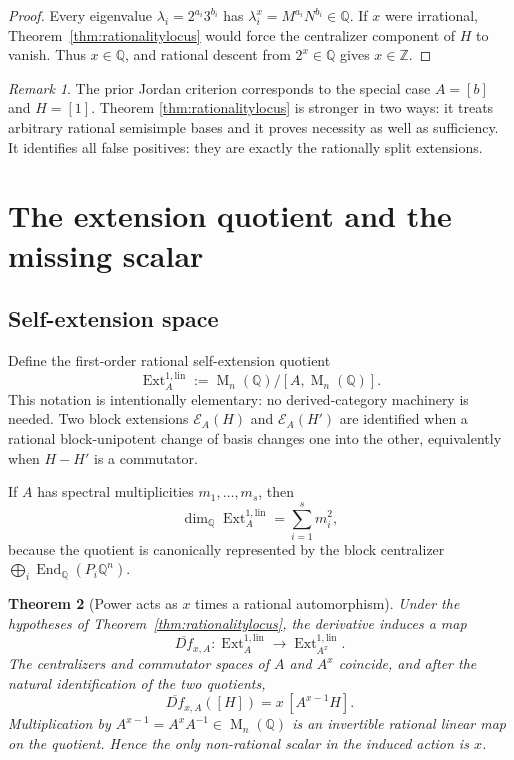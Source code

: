 \documentclass[11pt,oneside]{article}
\newtheorem{theorem}{Theorem}[section]
\theoremstyle{definition}
\theoremstyle{remark}
\newtheorem{remark}[theorem]{Remark}
\newcommand{\Z}{\mathbb Z}
\newcommand{\Q}{\mathbb Q}
\newcommand{\Mat}{\operatorname{M}}
\newcommand{\End}{\operatorname{End}}
\newcommand{\Ext}{\operatorname{Ext}}
\newcommand{\cE}{\mathcal E}
\begin{document}
\begin{proof}
Every eigenvalue $\lambda_i=2^{a_i}3^{b_i}$ has
$\lambda_i^x=M^{a_i}N^{b_i}\in\Q$.  If $x$ were irrational,
Theorem~\ref{thm:rationalitylocus} would force the centralizer component of $H$ to vanish.
Thus $x\in\Q$, and rational descent from $2^x\in\Q$ gives $x\in\Z$.
\end{proof}

\begin{remark}
The prior Jordan criterion corresponds to the special case $A=[b]$ and $H=[1]$.  Theorem
\ref{thm:rationalitylocus} is stronger in two ways: it treats arbitrary rational semisimple
bases and it proves necessity as well as sufficiency.  It identifies all false positives:
they are exactly the rationally split extensions.
\end{remark}

\section{The extension quotient and the missing scalar}
\label{sec:extensionquotient}

\subsection{Self-extension space}

Define the first-order rational self-extension quotient
\begin{equation}
 \Ext_A^{1,\mathrm{lin}}
 :=\Mat_n(\Q)/[A,\Mat_n(\Q)].
 \label{eq:extquotient}
\end{equation}
This notation is intentionally elementary: no derived-category machinery is needed.  Two block
extensions $\cE_A(H)$ and $\cE_A(H')$ are identified when a rational block-unipotent change of
basis changes one into the other, equivalently when $H-H'$ is a commutator.

If $A$ has spectral multiplicities $m_1,\dots,m_s$, then
\begin{equation}
 \dim_\Q \Ext_A^{1,\mathrm{lin}}=\sum_{i=1}^s m_i^2,
 \label{eq:extdimension}
\end{equation}
because the quotient is canonically represented by the block centralizer
$\bigoplus_i\End_\Q(P_i\Q^n)$.

\begin{theorem}[Power acts as $x$ times a rational automorphism]
\label{thm:quotientaction}
Under the hypotheses of Theorem~\ref{thm:rationalitylocus}, the derivative induces a map
\begin{equation}
 \overline{Df}_{x,A}:\Ext_A^{1,\mathrm{lin}}
 \longrightarrow \Ext_{A^x}^{1,\mathrm{lin}}.
 \label{eq:quotientmap}
\end{equation}
The centralizers and commutator spaces of $A$ and $A^x$ coincide, and after the natural
identification of the two quotients,
\begin{equation}
 \overline{Df}_{x,A}([H])
 =x\,[A^{x-1}H].
 \label{eq:xautomorphism}
\end{equation}
Multiplication by $A^{x-1}=A^xA^{-1}\in\Mat_n(\Q)$ is an invertible rational linear map on
the quotient.  Hence the only non-rational scalar in the induced action is $x$.
\end{theorem}
\end{document}
